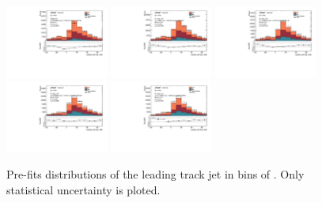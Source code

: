 \clearpage
\subsection{\zpt}

\begin{figure}[htbp]
  \centering
 \includegraphics[width=0.3\textwidth]{figures/gbb/Sub_Sd0_Fits/Canv_PreFit_0-Zp_T-01_LpT_INF_SpT_INF_coarse_x.pdf}
 \includegraphics[width=0.3\textwidth]{figures/gbb/Sub_Sd0_Fits/Canv_PreFit_01-Zp_T-02_LpT_INF_SpT_INF_coarse_x.pdf}
 \includegraphics[width=0.3\textwidth]{figures/gbb/Sub_Sd0_Fits/Canv_PreFit_02-Zp_T-03_LpT_INF_SpT_INF_coarse_x.pdf}\\
 \includegraphics[width=0.3\textwidth]{figures/gbb/Sub_Sd0_Fits/Canv_PreFit_03-Zp_T-04_LpT_INF_SpT_INF_coarse_x.pdf}
 \includegraphics[width=0.3\textwidth]{figures/gbb/Sub_Sd0_Fits/Canv_PreFit_04-Zp_T-05_LpT_INF_SpT_INF_coarse_x.pdf}

\caption{Pre-fits \subsdzero distributions of the leading track jet in bins of \zpt. Only statistical uncertainty is ploted.}
  \label{fig:ZpT-prefits-leading-sub}
\end{figure}


